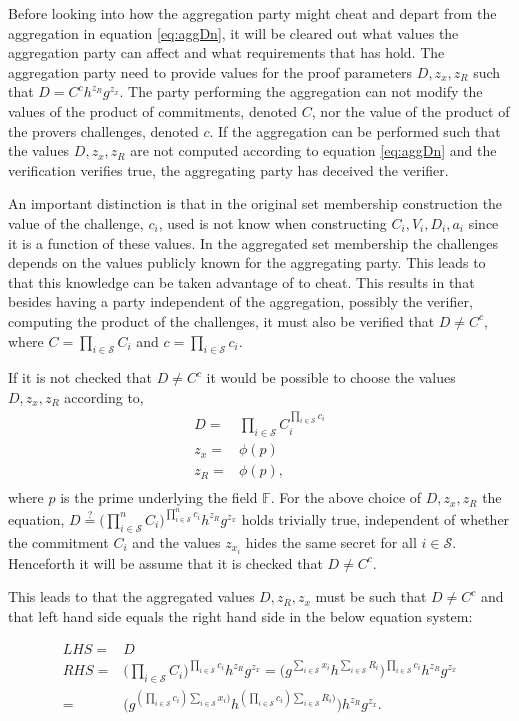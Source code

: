 Before looking into how the aggregation party might cheat and depart from the aggregation in equation \eqref{eq:aggDn}, it will be cleared out what values the aggregation party can affect and what requirements that has hold. The aggregation party need to provide values for the proof parameters $D,z_x,z_R$ such that $D=C^ch^{z_R}g^{z_x}$. The party performing the aggregation can not modify the values of the product of commitments, denoted $C$, nor the value of the product of the provers challenges, denoted $c$.  If the aggregation can be performed  such that the  values $D,z_x,z_R$ are not computed according to equation \eqref{eq:aggDn} and the verification verifies true, the aggregating party has deceived the verifier.

An important distinction is that in the original set membership construction the value of the challenge, $c_i$, used is not know when constructing $C_i,V_i,D_i,a_i$ since it is a function of these values. In the aggregated set membership the challenges depends on the values publicly known for the aggregating party. This leads to that this knowledge can be taken advantage of to cheat. This results in that besides having a party independent of the aggregation, possibly the verifier, computing the product of the challenges, it must also be verified that $D\neq C^c$, where $C=\prod_{i\in\mathcal{S}}C_i$ and $c=\prod_{i\in\mathcal{S}}c_i$.

If it is not checked that $D \neq C^c$ it would be possible to choose the values $D,z_x,z_R$ according to,
\begin{align*}
D =& \prod_{i\in\mathcal{S}} C_i ^{\prod_{i\in\mathcal{S}} c_i}	\\
z_x =& \phi(p)	\\
z_R =& \phi(p),	\\
\end{align*}
where $p$ is the prime underlying the field $\mathds{F}$. For the above choice of $D,z_x,z_R$ the equation, $D\overset{?}{=} \big(\prod_{i\in\mathcal{S}}^nC_i\big)^{\prod_{i\in\mathcal{S}}^n c_i} h^{z_R}g^{z_x}$ holds trivially true, independent of whether the commitment $C_i$ and the values $z_{x_i}$ hides the same secret for all $i\in\mathcal{S}$. Henceforth it will be assume that it is checked that $D \neq C^c$.


This leads to that the aggregated values $D,z_R,z_x$  must be such that $D \neq C^c$ and that left hand side equals the right hand side in the below equation system:

\begin{align*}
LHS =& D\\
RHS  =& \big(\prod_{i\in\mathcal{S}}C_i\big)^{\prod_{i\in\mathcal{S}} c_i} h^{z_R}g^{z_x} =
\big( g^{\sum_{i\in\mathcal{S}} x_i } h^{\sum_{i\in\mathcal{S}} R_i} \big) ^{\prod_{i\in\mathcal{S}} c_i}h^{z_R} g^{z_x} \\
=& \big( g^{ (  \prod_{i\in\mathcal{S}} c_i ) \sum_{i\in\mathcal{S}} x_i ) } h^{ ( \prod_{i\in\mathcal{S}}  c_i ) \sum_{i\in\mathcal{S}} R_i ) } \big)h^{z_R} g^{z_x}.
\end{align*}

